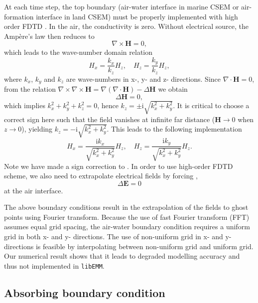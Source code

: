 \documentclass[a4paper,10pt]{article}
\begin{document}
At each time step, the top boundary (air-water interface in marine CSEM or air-formation interface in land CSEM) must be properly implemented with high order FDTD \citep{wang1993finite,oristaglio1984diffusion}. In the air, the conductivity is zero. Without electrical source, the Amp\`ere's law then reduces to
\begin{equation}
\nabla\times \mathbf{H} = 0,
\end{equation}
which leads to the wave-number domain relation
\begin{equation}
H_x = \frac{k_x}{k_z} H_z, \quad H_z=\frac{k_y}{k_z} H_z,
\end{equation}
where $k_x$, $k_y$ and $k_z$ are wave-numbers in x-, y- and z- directions. Since $\nabla\cdot \mathbf{H}=0$, from the relation $\nabla\times\nabla\times \mathbf{H}=\nabla(\nabla\cdot \mathbf{H})-\Delta \mathbf{H}$ we obtain
\begin{equation}
\Delta \mathbf{H} = 0,
\end{equation}
which implies $k_x^2 + k_y^2 + k_z^2=0$, hence $k_z=\pm \mathrm{i} \sqrt{k_x^2 + k_y^2}$. It is critical to choose a correct sign here such that the field vanishes at infinite far distance ($\mathbf{H}\rightarrow 0$ when $z\rightarrow 0$), yielding $k_z=-\mathrm{i} \sqrt{k_x^2 + k_y^2}$. This leads to the following implementation
\begin{equation}
H_x = \frac{\mathrm{i} k_x}{\sqrt{k_x^2+k_y^2}} H_z, \quad H_z=\frac{\mathrm{i}k_y}{\sqrt{k_x^2+k_y^2}} H_z.
\end{equation}
Note we have made a sign correction to \citep[equation 46]{Mittet_2010_HFD}. In order to use high-order FDTD scheme, we also need to extrapolate electrical fields by forcing  \citep{oristaglio1984diffusion},
\begin{equation}
\Delta \mathbf{E} = 0
\end{equation}
at the air interface.


The above boundary conditions result in the extrapolation of the fields to ghost points using Fourier transform. Because the use of fast Fourier transform (FFT) assumes equal grid spacing, the air-water boundary condition requires a uniform grid in both x- and y- directions. The use of non-uniform grid in x- and y- directions is feasible by interpolating between non-uniform grid and uniform grid. Our numerical result \citep{Yang_2023_HFDNU} shows that it leads to degraded modelling accuracy and thus not implemented in \verb|libEMM|.

\subsection{Absorbing boundary condition}
\end{document}
